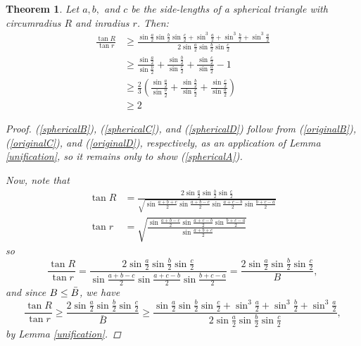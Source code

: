 \documentclass[12pt,notitlepage]{amsart}%
\newtheorem{theorem}{Theorem}[section]
\newcommand{\s}[1]{\sin \frac{#1}{2}}
\newcommand{\fracsums}{\frac{\s{a}}{\s{b}}+\frac{\s{b}}{\s{c}}+\frac{\s{c}}{\s{a}}}
\begin{document}
\begin{theorem}\label{spherical}
	Let $a,b,$ and $c$ be the side-lengths of a spherical 
    triangle with circumradius $R$ and inradius $r$. Then:
    \begin{subequations}
    	\begin{align}
		\frac{\tan R}{\tan r}&\geq
        \frac{\s{a}\s{b}\s{c}+\sin^3 \frac{a}{2}+\sin^3 \frac{b}{2}+\sin^3{\frac{a}{2}}}{2\s{a}\s{b}\s{c}} 	\label{sphericalA} \\
        &\geq\fracsums-1 	\label{sphericalB} \\
        &\geq\frac{2}{3} \left(\fracsums\right) 	\label{sphericalC} \\
        &\geq2\label{sphericalD}
    	\end{align}
    \end{subequations}
	\begin{proof}
	(\ref{sphericalB}), (\ref{sphericalC}), and (\ref{sphericalD}) follow from (\ref{originalB}), (\ref{originalC}), and (\ref{originalD}), respectively, as an application of Lemma \ref{unification}, so it remains only to show (\ref{sphericalA}).
    
    Now, note that
    \begin{align*}
    \tan R&=\frac{2\s{a}\s{b}\s{c}}{\sqrt{\s{a+b+c}\s{a+b-c}\s{a+c-b}\s{b+c-a}}}\\
	\tan r&=\sqrt{\frac{\s{a+b-c}\s{a+c-b}\s{b+c-a}}{\s{a+b+c}}}
	\end{align*}
	so
	\[\frac{\tan R}{\tan r}=\frac{2\s{a}\s{b}\s{c}}{\s{a+b-c}\s{a+c-b}\s{b+c-a}}=\frac{2\s{a}\s{b}\s{c}}{B},\]
	and since $B\leq\Bar{B}$, we have
    \[\frac{\tan R}{\tan r}\geq\frac{2\s{a}\s{b}\s{c}}{\bar{B}}\geq \frac{\s{a}\s{b}\s{c}+\sin^3 \frac{a}{2}+\sin^3 \frac{b}{2}+\sin^3{\frac{a}{2}}}{2\s{a}\s{b}\s{c}},\]
    by Lemma \ref{unification}.
	\end{proof}
\end{theorem}
\end{document}
